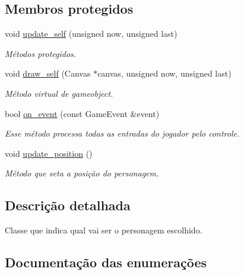 \subsection*{Membros protegidos}
\begin{DoxyCompactItemize}
\item 
void \mbox{\hyperlink{classCharacterSelection_ae398845f5f793f40ddf8314a0ad16f7e}{update\+\_\+self}} (unsigned now, unsigned last)
\begin{DoxyCompactList}\small\item\em Métodos protegidos. \end{DoxyCompactList}\item 
\mbox{\label{classCharacterSelection_a474bb5f07bc3c530b4988a463ff83bb5}} 
void \mbox{\hyperlink{classCharacterSelection_a474bb5f07bc3c530b4988a463ff83bb5}{draw\+\_\+self}} (Canvas $\ast$canvas, unsigned now, unsigned last)
\begin{DoxyCompactList}\small\item\em Método virtual de gameobject. \end{DoxyCompactList}\item 
bool \mbox{\hyperlink{classCharacterSelection_af7d87f81c8bc895a89d9f13c09ed6b35}{on\+\_\+event}} (const Game\+Event \&event)
\begin{DoxyCompactList}\small\item\em Esse método processa todas as entradas do jogador pelo controle. \end{DoxyCompactList}\item 
\mbox{\label{classCharacterSelection_aa0a17d7b1a2092b9346c626d8c097253}} 
void \mbox{\hyperlink{classCharacterSelection_aa0a17d7b1a2092b9346c626d8c097253}{update\+\_\+position}} ()
\begin{DoxyCompactList}\small\item\em Método que seta a posição do personagem. \end{DoxyCompactList}\end{DoxyCompactItemize}


\subsection{Descrição detalhada}
Classe que indica qual vai ser o personagem escolhido. 

\subsection{Documentação das enumerações}
\mbox{\label{classCharacterSelection_a14b33a13e3498992faa7261e6f5e55ca}} 
